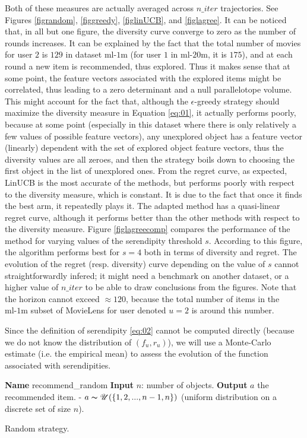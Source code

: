 \documentclass{article}
\begin{document}
Both of these measures are actually averaged across $n\_iter$ trajectories. See Figures \ref{figrandom}, \ref{figgreedy}, \ref{figlinUCB}, and \ref{figlagree}. It can be noticed that, in all but one figure, the diversity curve converge to zero as the number of rounds increases. It can be explained by the fact that the total number of movies for user $2$ is $129$ in dataset $\text{ml-1m}$ (for user $1$ in $\text{ml-20m}$, it is $175$), and at each round a new item is recommended, thus explored. Thus it makes sense that at some point, the feature vectors associated with the explored items might be correlated, thus leading to a zero determinant and a null parallelotope volume. This might account for the fact that, although the $\epsilon$-greedy strategy should maximize the diversity measure in Equation \ref{eq:01}, it actually performs poorly, because at some point (especially in this dataset where there is only relatively a few values of possible feature vectors), any unexplored object has a feature vector (linearly) dependent with the set of explored object feature vectors, thus the diversity values are all zeroes, and then the strategy boils down to choosing the first object in the list of unexplored ones. From the regret curve, as expected, LinUCB is the most accurate of the methods, but performs poorly with respect to the diversity measure, which is constant. It is due to the fact that once it finds the best arm, it repeatedly plays it. The adapted method has a quasi-linear regret curve, although it performs better than the other methods with respect to the diversity measure. Figure \ref{figlagreecomp} compares the performance of the method for varying values of the serendipity threshold $s$. According to this figure, the algorithm performs best for $s=4$ both in terms of diversity and regret. The evolution of the regret (resp. diversity) curve depending on the value of $s$ cannot straightforwardly infered; it might need a benchmark on another dataset, or a higher value of $n\_iter$ to be able to draw conclusions from the figures. Note that the horizon cannot exceed $\approx 120$, because the total number of items in the $\text{ml-1m}$ subset of MovieLens for user denoted $u=2$ is around this number. 

Since the definition of serendipity \ref{eq:02} cannot be computed directly (because we do not know the distribution of $(f_{u}, r_{u})$), we will use a Monte-Carlo estimate (i.e. the empirical mean) to assess the evolution of the function associated with serendipities.

\begin{algorithm}
\begin{algorithmic}
\STATE \textbf{Name} recommend\_random
\STATE \textbf{Input} $n$: number of objects.
\STATE \textbf{Output} $a$ the recommended item.
\STATE - $a \thicksim \mathscr{U}(\{1, 2, ..., n-1, n\})$ (uniform distribution on a discrete set of size $n$).
\end{algorithmic}
\caption{Random strategy.}
\label{random}
\end{algorithm}
\end{document}
